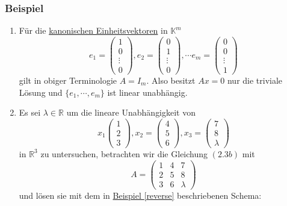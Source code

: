 \subsubsection{Beispiel}
\label{2.3.10}
\renewcommand{\labelenumi}{(\arabic{enumi})}
\begin{enumerate}
\item Für die \underline{kanonischen Einheitsvektoren} in $\mathbb{K}^m$
\[ e_1=\begin{pmatrix}1\\ 0 \\ \vdots \\ 0\end{pmatrix},e_2=\begin{pmatrix}0\\ 1 \\ \vdots \\ 0\end{pmatrix}, \cdots e_m=\begin{pmatrix}0 \\ 0 \\ \vdots \\ 1\end{pmatrix}\]
gilt in obiger Terminologie $A=I_m$.  Also besitzt $Ax=0$ nur die triviale Lösung und $\{e_1,\cdots ,e_m\}$ ist linear unabhängig.
\item Es sei $\lambda \in \mathbb{R}$ um die lineare Unabhängigkeit von 
\[x_1\begin{pmatrix}1\\ 2\\ 3\end{pmatrix}, x_2=\begin{pmatrix}4\\ 5\\ 6\end{pmatrix}, x_3=\begin{pmatrix}7\\ 8\\ \lambda \end{pmatrix}\]
in $\mathbb{R}^3$ zu untersuchen, betrachten wir die Gleichung $(2.3b)$ mit
\[A=\begin{pmatrix}1 & 4 & 7\\2 & 5 & 8\\ 3 & 6 & \lambda\end{pmatrix}\]
und lösen sie mit dem in \hyperref[reverse]{Beispiel \ref*{reverse}} beschriebenen Schema:

\end{enumerate}
